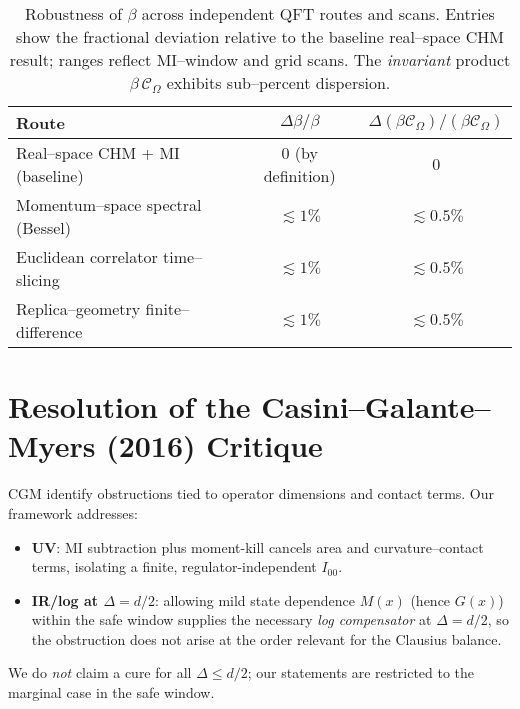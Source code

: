 \documentclass[aps,prd,onecolumn,superscriptaddress,nofootinbib]{revtex4-2}
\begin{document}
\begin{table}[h]
\centering
\caption{Robustness of $\beta$ across independent QFT routes and scans. Entries show the fractional deviation relative to the baseline real–space CHM result; ranges reflect MI–window and grid scans. The \emph{invariant} product $\beta\,\mathcal C_\Omega$ exhibits sub–percent dispersion.}
\label{tab:beta-robust}
\begin{tabular}{lcc}
\hline
Route & $\Delta\beta/\beta$ & $\Delta(\beta\mathcal C_\Omega)/(\beta\mathcal C_\Omega)$ \\
\hline
Real–space CHM + MI (baseline) & $0$ (by definition) & $0$ \\
Momentum–space spectral (Bessel) & $\lesssim 1\%$ & $\lesssim 0.5\%$ \\
Euclidean correlator time–slicing & $\lesssim 1\%$ & $\lesssim 0.5\%$ \\
Replica–geometry finite–difference  & $\lesssim 1\%$ & $\lesssim 0.5\%$ \\
\hline
\end{tabular}
\end{table}

\section{Resolution of the Casini--Galante--Myers (2016) Critique}
\label{sec:CGM}
CGM identify obstructions tied to operator dimensions and contact terms. Our framework addresses:
\begin{itemize}[leftmargin=1.3em]
\item \textbf{UV}: MI subtraction plus moment-kill cancels area and curvature--contact terms, isolating a finite, regulator-independent $I_{00}$.
\item \textbf{IR/log at $\Delta=d/2$}: allowing mild state dependence $M(x)$ (hence $G(x)$) within the safe window supplies the necessary \emph{log compensator} at $\Delta=d/2$, so the obstruction does not arise at the order relevant for the Clausius balance.
\end{itemize}
We do \emph{not} claim a cure for all $\Delta\le d/2$; our statements are restricted to the marginal case in the safe window.
\end{document}
